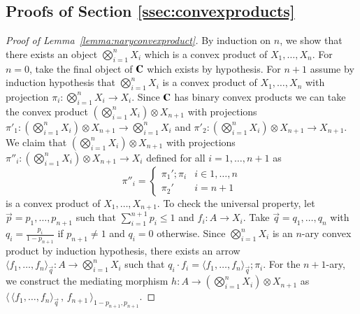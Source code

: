 \subsection{Proofs of Section \ref{ssec:convexproducts}}
\begin{proof}[Proof of Lemma~\ref{lemma:naryconvexproduct}]%
By induction on $n$, we show that there exists an object $\bigotimes_{i=1}^n X_i$ which is a convex product of $X_1, \dots, X_n$. For $n=0$, take the final object of $\mathbf{C}$ which exists by hypothesis. %
For $n+1$ assume by induction hypothesis that $\bigotimes_{i=1}^n X_i$ is a convex product of $X_1, \dots, X_n$ with projection $\pi_i\colon \bigotimes_{i=1}^n X_i \to X_i$. Since $\mathbf{C}$ has binary convex products we can take the convex product $(\bigotimes_{i=1}^n X_i) \otimes X_{n+1}$ with projections $\pi'_1\colon (\bigotimes_{i=1}^n X_i) \otimes X_{n+1} \to \bigotimes_{i=1}^n X_i$ and $\pi'_2\colon (\bigotimes_{i=1}^n X_i) \otimes X_{n+1} \to X_{n+1}$. We claim that $(\bigotimes_{i=1}^n X_i) \otimes X_{n+1}$ with projections $\pi''_i\colon (\bigotimes_{i=1}^n X_i) \otimes X_{n+1} \to X_i$ defined for all $i= 1,\dots, n+1$ as 
\[\pi''_i = \begin{cases} \pi_1'; \pi_i & i\in 1,\dots, n \\ \pi_2' & i=n+1 \end{cases}\]
is a convex product of $X_1, \dots, X_{n+1}$. 
To check the universal property, let $\vec{p}=p_1,\dots, p_{n+1}$ such that $\sum_{i=1}^{n+1}p_i\leq 1$ and $f_i\colon A \to X_i$. Take $\vec{q}=q_1,\dots, q_n$ with $q_i=\frac{p_i}{1-p_{n+1}}$ if $p_{n+1}\not= 1$ and $q_i=0$ otherwise. Since  $\bigotimes_{i=1}^n X_i$ is an $n$-ary convex product by induction hypothesis, there exists an arrow $\langle f_1, \dots ,f_n\rangle_{\vec{q}} \colon A \to \bigotimes_{i=1}^n X_i$ such that $q_i\cdot f_i = \langle f_1, \dots ,f_n\rangle_{\vec{q}} ; \pi_i$. For the $n+1$-ary, we construct the mediating morphism $h\colon A \to (\bigotimes_{i=1}^n X_i) \otimes X_{n+1}$ as $\langle \, \langle f_1, \dots ,f_n\rangle_{\vec{q}} \,,\, f_{n+1} \, \rangle_{1-p_{n+1},p_{n+1}}$.
 \end{proof}



